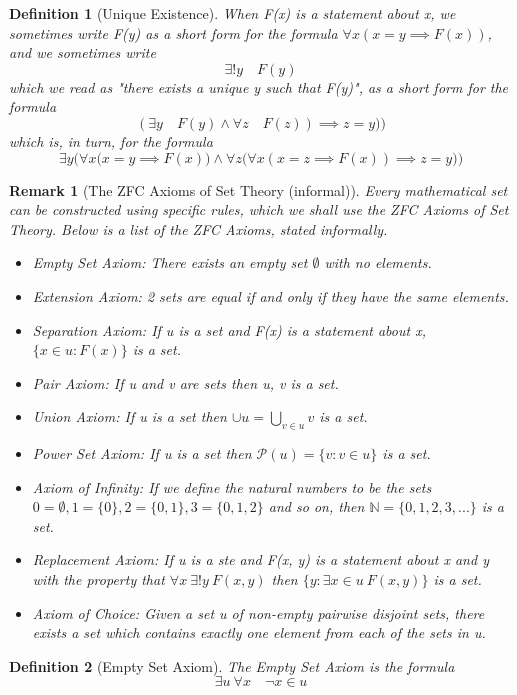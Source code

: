 \documentclass[11pt, oneside]{book}
\theoremstyle{break}
\newtheorem*{remark}{Remark}
\newtheorem{defn}{Definition}[section]
\newcommand{\bb}[1]{\mathbb{#1}}		%
\begin{document}
\begin{defn}[Unique Existence]
	When F(x) is a statement about x, we sometimes write F(y) as a short form for the formula $\forall x(x=y\implies F(x))$, and we sometimes write
	\[
		\exists!y \quad F(y)
	\]
	which we read as "there exists a unique y such that F(y)", as a short form for the formula
	\[
		(\exists y \quad F(y) \land \forall z \quad F(z)) \implies z = y))
	\] which is, in turn, for the formula
	\[
		\exists y \bigg( \forall x \Big(x = y \implies F(x) \Big) \land \forall z \Big(\forall x (x = z \implies F(x)) \implies z = y \Big) \bigg)
	\]
\end{defn}

\begin{remark}[The ZFC Axioms of Set Theory (informal)]
	Every mathematical set can be constructed using specific rules, which we shall use the ZFC Axioms of Set Theory. Below is a list of the ZFC Axioms, stated informally.
	\begin{itemize}
		\item Empty Set Axiom: There exists an empty set $\emptyset$ with no elements.
		\item Extension Axiom: 2 sets are equal if and only if they have the same elements.
		\item Separation Axiom: If u is a set and F(x) is a statement about x, $\{x \in u : F(x)\}$ is a set.
		\item Pair Axiom: If u and v are sets then {u, v} is a set.
		\item Union Axiom: If u is a set then $\cup u = \bigcup\limits_{v \in u} v$ is a set.
		\item Power Set Axiom: If u is a set then $\mathcal{P}(u) = \{v : v \in u\}$ is a set.
		\item Axiom of Infinity: If we define the natural numbers to be the sets $0 = \emptyset, 1 = \{0\}, 2 = \{0, 1\}, 3 = \{0, 1, 2\}$ and so on, then $\bb{N} = \{0, 1, 2, 3, ...\}$ is a set.
		\item Replacement Axiom: If u is a ste and F(x, y) is a statement about x and y with the property that $\forall x \> \exists! y \> F(x,y)$ then $\{y : \exists x \in u \> F(x,y)\}$ is a set.
		\item Axiom of Choice: Given a set u of non-empty pairwise disjoint sets, there exists a set which contains exactly one element from each of the sets in u.
	\end{itemize}
\end{remark}

\begin{defn}[Empty Set Axiom]
	The Empty Set Axiom is the formula
	\[
		\exists u \> \forall x \quad \neg x \in u
	\]
\end{defn}
\end{document}
